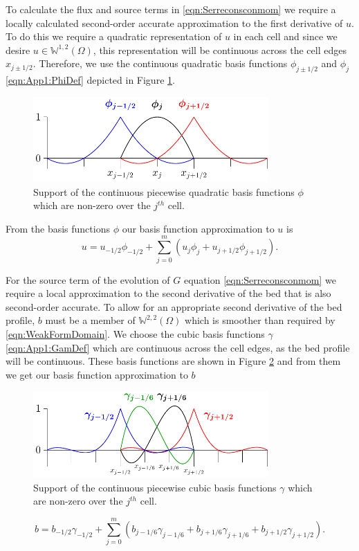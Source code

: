 To calculate the flux and source terms in \eqref{eqn:Serreconsconmom} we require a locally calculated second-order accurate approximation to the first derivative of $u$. To do this we require a quadratic representation of $u$ in each cell and since we desire $u\in\mathbb{W}^{1,2}(\Omega)$, this representation will be continuous across the cell edges $x_{j \pm 1/2}$. Therefore, we use the continuous quadratic basis functions $\phi_{j\pm1/2} $ and $\phi_{j} $ \eqref{eqn:App1:PhiDef} depicted in Figure \ref{fig:P2ContBasis}.
\begin{figure}
	\centering
	\includegraphics[width=0.8\textwidth]{./chp3/figures/P2.pdf}
	\caption{Support of the continuous piecewise quadratic basis functions $\phi$ which are non-zero over the $j^{th}$ cell.}
	\label{fig:P2ContBasis}
\end{figure}

From the basis functions $\phi$ our basis function approximation to $u$ is
\begin{equation}
u = u_{-1/2}\phi_{-1/2} + \sum_{j=0}^m \left( u_{j}\phi_{j} + u_{j+1/2}\phi_{j+1/2} \right).
\label{eqn:FEapproxtou}
\end{equation}

For the source term of the evolution of $G$ equation \eqref{eqn:Serreconsconmom} we require a local approximation to the second derivative of the bed that is also second-order accurate. To allow for an appropriate second derivative of the bed profile, $b$ must be a member of $\mathbb{W}^{2,2}(\Omega)$ which is smoother than required by \eqref{eqn:WeakFormDomain}. We choose the cubic basis functions $\gamma$ \eqref{eqn:App1:GamDef} which are continuous across the cell edges, as the bed profile will be continuous. These basis functions are shown in Figure \ref{fig:P3ContBasis} and from them we get our basis function approximation to $b$
\begin{figure}
	\centering
	\includegraphics[width=0.8\textwidth]{./chp3/figures/P3.pdf}
	\caption{Support of the continuous piecewise cubic basis functions $\gamma$ which are non-zero over the $j^{th}$ cell.}
	\label{fig:P3ContBasis}
\end{figure}
\begin{equation}
b = b_{-1/2}\gamma_{-1/2} +  \sum_{j=0}^m \left(b_{j-1/6}\gamma_{j-1/6}  + b_{j+1/6}\gamma_{j+1/6} + b_{j+1/2}\gamma_{j+1/2} \right).
\label{eqn:FEapproxtob}
\end{equation}

